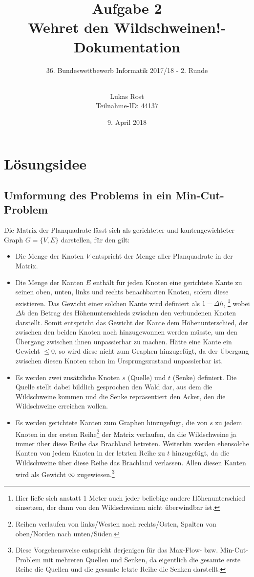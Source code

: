 \documentclass[a4paper, notitlepage, 12pt]{scrartcl}
\author{Lukas Rost \\ \small{Teilnahme-ID: 44137}}
\title{Aufgabe 2 \\ \glqq Wehret den Wildschweinen!\grqq  - Dokumentation}
\subtitle{36. Bundeswettbewerb Informatik 2017/18 - 2. Runde \\~\\}
\date{9. April 2018}
\begin{document}
\renewcommand{\contentsname}{\centerline{Inhaltsverzeichnis}}
 \maketitle
 \tableofcontents
 \thispagestyle{empty}
 \newpage
 \setcounter{page}{1}
 
 \section{Lösungsidee}
 \subsection{Umformung des Problems in ein Min-Cut-Problem}
 \label{sec:umform}
 Die Matrix der Planquadrate lässt sich als gerichteter und kantengewichteter Graph $G = \{V,E\}$ darstellen, für den gilt:
 \begin{itemize}
 \item Die Menge der Knoten $V$ entspricht der Menge aller Planquadrate in der Matrix.
 \item Die Menge der Kanten $E$ enthält für jeden Knoten eine gerichtete Kante zu seinen oben, unten, links und rechts benachbarten Knoten, sofern diese existieren. Das Gewicht einer solchen Kante wird definiert als $ 1 - \Delta h$, \footnote{Hier ließe sich anstatt 1 Meter auch jeder beliebige andere Höhenunterschied einsetzen, der dann von den Wildschweinen nicht überwindbar ist.} wobei $\Delta h$ den Betrag des Höhenunterschieds zwischen den verbundenen Knoten darstellt. Somit entspricht das Gewicht der Kante dem Höhenunterschied, der zwischen den beiden Knoten noch hinzugewonnen werden müsste, um den Übergang zwischen ihnen unpassierbar zu machen. Hätte eine Kante ein Gewicht $\leq 0$, so wird diese nicht zum Graphen hinzugefügt, da der Übergang zwischen diesen Knoten schon im Ursprungszustand unpassierbar ist.
 \item Es werden zwei zusätzliche Knoten $s$ (Quelle) und $t$ (Senke) definiert. Die Quelle stellt dabei bildlich gesprochen den Wald dar, aus dem die Wildschweine kommen und die Senke repräsentiert den Acker, den die Wildschweine erreichen wollen.
 \item Es werden gerichtete Kanten zum Graphen hinzugefügt, die von $s$ zu jedem Knoten in der ersten Reihe\footnote{Reihen verlaufen von links/Westen nach rechts/Osten, Spalten von oben/Norden nach unten/Süden.} der Matrix verlaufen, da die Wildschweine ja immer über diese Reihe das Brachland betreten. Weiterhin werden ebensolche Kanten von jedem Knoten in der letzten Reihe zu $t$ hinzugefügt, da die Wildschweine über diese Reihe das Brachland verlassen. Allen diesen Kanten wird als Gewicht $\infty$ zugewiesen.\footnote{Diese Vorgehensweise entspricht derjenigen für das Max-Flow- bzw. Min-Cut-Problem mit mehreren Quellen und Senken, da eigentlich die gesamte erste Reihe die Quellen und die gesamte letzte Reihe die Senken darstellt.\cite{Src:Multiple}}
 \end{itemize}
\end{document}
